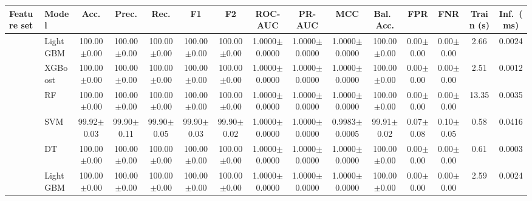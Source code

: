 \begin{tabular}{@{}llccccccccccccc@{}}
\toprule
\textbf{Feature set} & \textbf{Model} & \textbf{Acc.} & \textbf{Prec.} & \textbf{Rec.} & \textbf{F1} & \textbf{F2} & \textbf{ROC-AUC} & \textbf{PR-AUC} & \textbf{MCC} & \textbf{Bal.\ Acc.} & \textbf{FPR} & \textbf{FNR} & \textbf{Train (s)} & \textbf{Inf.\ (ms)}\\
\midrule
{} & LightGBM & 100.00{\tiny$\pm$0.00} & 100.00{\tiny$\pm$0.00} & 100.00{\tiny$\pm$0.00} & 100.00{\tiny$\pm$0.00} & 100.00{\tiny$\pm$0.00} & 1.0000{\tiny$\pm$0.0000} & 1.0000{\tiny$\pm$0.0000} & 1.0000{\tiny$\pm$0.0000} & 100.00{\tiny$\pm$0.00} & 0.00{\tiny$\pm$0.00} & 0.00{\tiny$\pm$0.00} & 2.66 & 0.0024\\
 & XGBoost & 100.00{\tiny$\pm$0.00} & 100.00{\tiny$\pm$0.00} & 100.00{\tiny$\pm$0.00} & 100.00{\tiny$\pm$0.00} & 100.00{\tiny$\pm$0.00} & 1.0000{\tiny$\pm$0.0000} & 1.0000{\tiny$\pm$0.0000} & 1.0000{\tiny$\pm$0.0000} & 100.00{\tiny$\pm$0.00} & 0.00{\tiny$\pm$0.00} & 0.00{\tiny$\pm$0.00} & 2.51 & 0.0012\\
 & RF & 100.00{\tiny$\pm$0.00} & 100.00{\tiny$\pm$0.00} & 100.00{\tiny$\pm$0.00} & 100.00{\tiny$\pm$0.00} & 100.00{\tiny$\pm$0.00} & 1.0000{\tiny$\pm$0.0000} & 1.0000{\tiny$\pm$0.0000} & 1.0000{\tiny$\pm$0.0000} & 100.00{\tiny$\pm$0.00} & 0.00{\tiny$\pm$0.00} & 0.00{\tiny$\pm$0.00} & 13.35 & 0.0035\\
 & SVM & 99.92{\tiny$\pm$0.03} & 99.90{\tiny$\pm$0.11} & 99.90{\tiny$\pm$0.05} & 99.90{\tiny$\pm$0.03} & 99.90{\tiny$\pm$0.02} & 1.0000{\tiny$\pm$0.0000} & 1.0000{\tiny$\pm$0.0000} & 0.9983{\tiny$\pm$0.0005} & 99.91{\tiny$\pm$0.02} & 0.07{\tiny$\pm$0.08} & 0.10{\tiny$\pm$0.05} & 0.58 & 0.0416\\
 & DT & 100.00{\tiny$\pm$0.00} & 100.00{\tiny$\pm$0.00} & 100.00{\tiny$\pm$0.00} & 100.00{\tiny$\pm$0.00} & 100.00{\tiny$\pm$0.00} & 1.0000{\tiny$\pm$0.0000} & 1.0000{\tiny$\pm$0.0000} & 1.0000{\tiny$\pm$0.0000} & 100.00{\tiny$\pm$0.00} & 0.00{\tiny$\pm$0.00} & 0.00{\tiny$\pm$0.00} & 0.61 & 0.0003\\
\midrule
{} & LightGBM & 100.00{\tiny$\pm$0.00} & 100.00{\tiny$\pm$0.00} & 100.00{\tiny$\pm$0.00} & 100.00{\tiny$\pm$0.00} & 100.00{\tiny$\pm$0.00} & 1.0000{\tiny$\pm$0.0000} & 1.0000{\tiny$\pm$0.0000} & 1.0000{\tiny$\pm$0.0000} & 100.00{\tiny$\pm$0.00} & 0.00{\tiny$\pm$0.00} & 0.00{\tiny$\pm$0.00} & 2.59 & 0.0024\\

\end{tabular}
